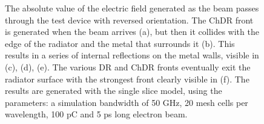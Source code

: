 \begin{figure}[!t]
\hspace{2mm}
\hspace{2mm}

\caption{The absolute value of the electric field generated as the beam passes through the test device with reversed orientation. The ChDR front is generated when the beam arrives (a), but then it collides with the edge of the radiator and the metal that surrounds it (b). This results in a series of internal reflections on the metal walls, visible in (c), (d), (e). The various DR and ChDR fronts eventually exit the radiator surface with the strongest front clearly visible in (f). The results are generated with the single slice model, using the parameters: a simulation bandwidth of 50 GHz, 20 mesh cells per wavelength, 100 pC and 5 ps long electron beam.}
\label{fig:field_CLEAR_directivity}
\end{figure}


